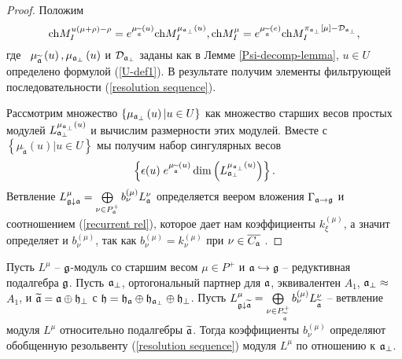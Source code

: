 \begin{proof}
Положим
\begin{equation*}
\mathrm{ch}M_{I}^{u\left( \mu +\rho \right) -\rho }=e^{\mu _{\widetilde{%
\frak{a}}}\left( u\right) }\mathrm{ch}M_{I}^{\mu _{\frak{a}_{\perp }}\left(
u\right) },\mathrm{ch}M_{I}^{\mu }=e^{\mu _{\widetilde{\frak{a}}}\left(
e\right) }\mathrm{ch}M_{I}^{\pi _{\frak{a}_{\perp }}\left[ \mu \right] -%
\mathcal{D}_{\frak{a}_{\perp }}},
\end{equation*}
где \ $\mu _{\widetilde{\frak{a}}}\left( u\right) ,\mu _{\frak{a}_{\perp
}}\left( u\right) $ и $\mathcal{D}_{\frak{a}_{\perp }}$ заданы как в Лемме \ref{Psi-decomp-lemma}, $%
u\in U$ определено формулой (\ref{U-def1}). В результате получим элементы фильтрующей последовательности (\ref{resolution sequence}).

Рассмотрим множество $\left\{ \mu _{\frak{a}_{\perp }}\left( u\right) |u\in U\right\} $ как множество старших весов простых модулей $L_{\frak{a}%
_{\perp }}^{\mu _{\frak{a}_{\perp }}\left( u\right) }$ и вычислим размерности этих модулей. Вместе с 
$\left\{ \mu _{\widetilde{\mathfrak{a}}}\left( u\right) |u\in
U\right\} $ мы получим набор сингулярных весов
\begin{equation*}
\left\{ \epsilon (u)\;
e^{\mu _{\widetilde{\mathfrak{a}}}\left( u\right) }
\dim \left( L_{\frak{a}_{\perp }}^{\mu _{\frak{a}_{\perp
}}\left( u\right) }\right) \right\} .
\end{equation*}
Ветвление  $L_{\frak{g}\downarrow \frak{a}}^{\mu }=\bigoplus\limits_{\nu
\in P_{\frak{a}}^{+}}b_{\nu }^{\left( \mu \right) }L_{\frak{a}}^{\nu }$  определяется веером вложения  $\Gamma _{\frak{a}\rightarrow \frak{g}}$ и соотношением (\ref{recurrent rel}), которое дает нам коэффициенты  $k_{\xi
}^{\left( \mu \right) }$, а значит определяет и  $b_{\nu }^{\left( \mu \right) }$, так как  $b_{\nu }^{\left( \mu \right) }=k_{\nu }^{\left( \mu
\right) }$ при $\nu \in \overline{C_{\frak{a}}}$ .
\end{proof}

\begin{corollary}
Пусть  $L^{\mu }$ --  $\frak{g}$-модуль со старшим весом $\mu \in P^{+}$ и  $\frak{a}\hookrightarrow \frak{g}$ -- редуктивная подалгебра $\frak{g}$. Пусть $\frak{a}_{\perp }$, ортогональный партнер для $\frak{a}$, эквивалентен  $A_{1}$, $\frak{a}_{\perp }\approx $ $A_{1}$, и $\widetilde{\frak{a}}=\frak{a}\oplus \frak{h}_{\perp }$ с $\frak{h=\frak{h}_{\frak{a}}}\oplus \frak{h}_{\frak{a}_{\perp }}\oplus \frak{h}_{\perp }$. Пусть $L_{\frak{g}\downarrow \widetilde{\frak{a}}}^{\mu }=\bigoplus\limits_{\nu \in P_{\widetilde{\frak{a}}}^{+}}b_{\nu }^{\left( \mu \right) }L_{\widetilde{\frak{a}}}^{\nu }$ -- ветвление модуля $L^{\mu }$ относительно подалгебры $\widetilde{\frak{%
a}}$. Тогда коэффициенты $b_{\nu }^{\left( \mu \right) }$ определяют обобщенную резольвенту (\ref{resolution sequence}) модуля $L^{\mu }$
по отношению к  $\frak{a}_{\perp }$.
\end{corollary}


